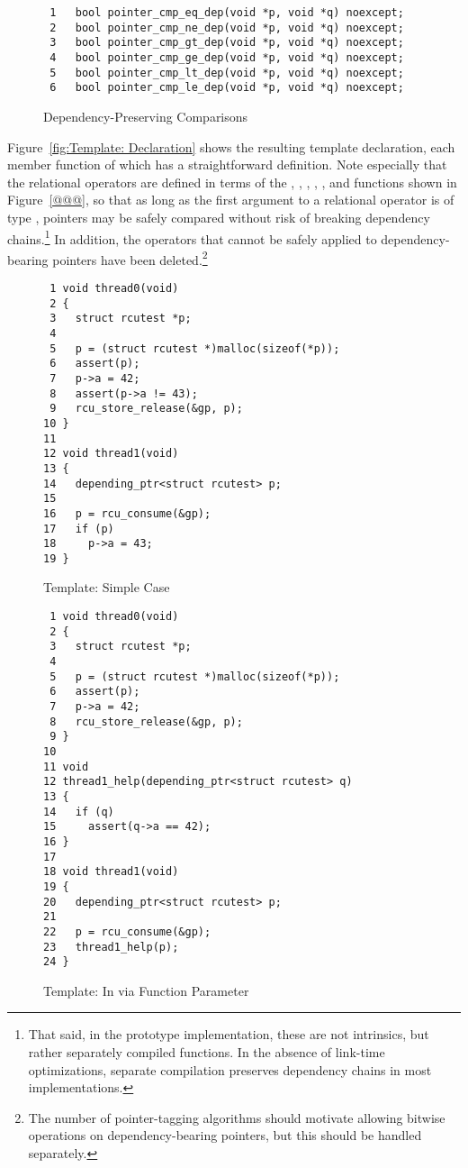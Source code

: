 \begin{figure}[tbp]
{ \scriptsize
\begin{verbatim}
 1   bool pointer_cmp_eq_dep(void *p, void *q) noexcept;
 2   bool pointer_cmp_ne_dep(void *p, void *q) noexcept;
 3   bool pointer_cmp_gt_dep(void *p, void *q) noexcept;
 4   bool pointer_cmp_ge_dep(void *p, void *q) noexcept;
 5   bool pointer_cmp_lt_dep(void *p, void *q) noexcept;
 6   bool pointer_cmp_le_dep(void *p, void *q) noexcept;
\end{verbatim}
}
\caption{Dependency-Preserving Comparisons}
\label{fig:Dependency-Preserving Comparisons}
\end{figure}

Figure~\ref{fig:Template: Declaration}
shows the resulting template declaration, each member function of which
has a straightforward definition.
Note especially that the relational operators are defined in terms of the
,
,
,
,
, and
functions shown in
Figure~\ref{@@@},
so that as long as the first argument to a relational operator is of type
,
pointers may be safely compared without risk of breaking dependency
chains.\footnote{
	That said, in the prototype implementation,
	these are not intrinsics, but rather separately compiled functions.
	In the absence of link-time optimizations, separate compilation
	preserves dependency chains in most implementations.}
In addition, the operators that cannot be safely applied to
dependency-bearing pointers have been deleted.\footnote{
	The number of pointer-tagging algorithms should motivate
	allowing bitwise operations on dependency-bearing
	pointers, but this should be handled separately.}

\begin{figure}[tbp]
{ \scriptsize
\begin{verbatim}
 1 void thread0(void)
 2 {
 3   struct rcutest *p;
 4
 5   p = (struct rcutest *)malloc(sizeof(*p));
 6   assert(p);
 7   p->a = 42;
 8   assert(p->a != 43);
 9   rcu_store_release(&gp, p);
10 }
11
12 void thread1(void)
13 {
14   depending_ptr<struct rcutest> p;
15
16   p = rcu_consume(&gp);
17   if (p)
18     p->a = 43;
19 }
\end{verbatim}
}
\caption{Template: Simple Case}
\label{fig:Template: Simple Case}
\end{figure}

\begin{figure}[tbp]
{ \scriptsize
\begin{verbatim}
 1 void thread0(void)
 2 {
 3   struct rcutest *p;
 4
 5   p = (struct rcutest *)malloc(sizeof(*p));
 6   assert(p);
 7   p->a = 42;
 8   rcu_store_release(&gp, p);
 9 }
10
11 void
12 thread1_help(depending_ptr<struct rcutest> q)
13 {
14   if (q)
15     assert(q->a == 42);
16 }
17
18 void thread1(void)
19 {
20   depending_ptr<struct rcutest> p;
21
22   p = rcu_consume(&gp);
23   thread1_help(p);
24 }
\end{verbatim}
}
\caption{Template: In via Function Parameter}
\label{fig:Template: In via Function Parameter}
\end{figure}

